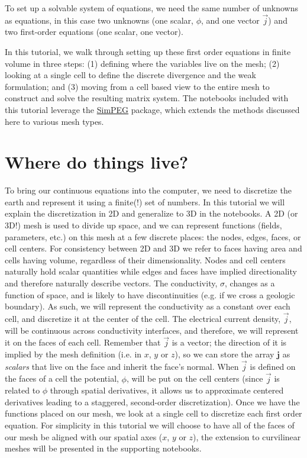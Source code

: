 \documentclass[Journal,InsideFigs,DoubleSpace,12pt,letterpaper]{ascelike-new}
\begin{document}
To set up a solvable system of equations, we need the same number of unknowns as equations, in this case two unknowns (one scalar, $\phi$, and one vector $\vec{j}$) and two first-order equations (one scalar, one vector).

In this tutorial, we walk through setting up these first order equations in finite volume in three steps: (1) defining where the variables live on the mesh; (2) looking at a single cell to define the discrete divergence and the weak formulation; and (3) moving from a cell based view to the entire mesh to construct and solve the resulting matrix system. The notebooks included with this tutorial leverage the \href{http://simpeg.xyz/}{SimPEG} package, which extends the methods discussed here to various mesh types.

\section{Where do things live?}\label{Where do things live?}

To bring our continuous equations into the computer, we need to discretize the earth and represent it using a finite(!) set of numbers. In this tutorial we will explain the discretization in 2D and generalize to 3D in the notebooks. A 2D (or 3D!) mesh is used to divide up space, and we can represent functions (fields, parameters, etc.) on this mesh at a few discrete places: the nodes, edges, faces, or cell centers. For consistency between 2D and 3D we refer to faces having area and cells having volume, regardless of their dimensionality. Nodes and cell centers naturally hold scalar quantities while edges and faces have implied directionality and therefore naturally describe vectors. The conductivity, $\sigma$, changes as a function of space, and is likely to have discontinuities (e.g. if we cross a geologic boundary). As such, we will represent the conductivity as a constant over each cell, and discretize it at the center of the cell. The electrical current density, $\vec{j}$, will be continuous across conductivity interfaces, and therefore, we will represent it on the faces of each cell. Remember that $\vec{j}$ is a vector; the direction of it is implied by the mesh definition (i.e. in $x$, $y$ or $z$), so we can store the array $\mathbf{j}$ as \textit{scalars} that live on the face and inherit the face's normal. When $\vec{j}$ is defined on the faces of a cell the potential, $\phi$, will be put on the cell centers (since $\vec{j}$ is related to $\phi$ through spatial derivatives, it allows us to approximate centered derivatives leading to a staggered, second-order discretization). Once we have the functions placed on our mesh, we look at a single cell to discretize each first order equation. For simplicity in this tutorial we will choose to have all of the faces of our mesh be aligned with our spatial axes ($x$, $y$ or $z$), the extension to curvilinear meshes will be presented in the supporting notebooks.
\end{document}
